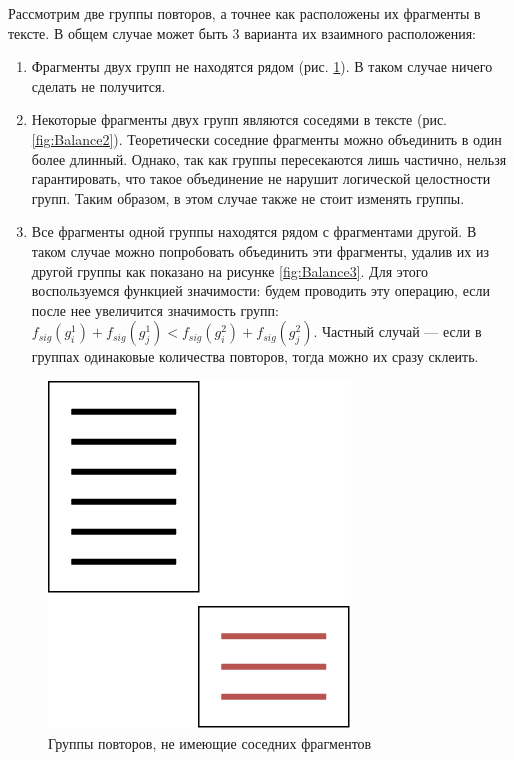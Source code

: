 \documentclass[14pt]{matmex-diploma-custom}
\begin{document}
Рассмотрим две группы повторов, а точнее как расположены их фрагменты в тексте. В общем случае может быть 3 варианта их взаимного расположения:
\begin{enumerate}
	\item Фрагменты двух групп не находятся рядом (рис. \ref{fig:Balance1}). В таком случае ничего сделать не получится.
	\item Некоторые фрагменты двух групп являются соседями в тексте (рис. \ref{fig:Balance2}). Теоретически соседние фрагменты можно объединить в один более длинный. Однако, так как группы пересекаются лишь частично, нельзя гарантировать, что такое объединение не нарушит логической целостности групп. Таким образом, в этом случае также не стоит изменять группы.
	\item Все фрагменты одной группы находятся рядом с фрагментами другой. В таком случае можно попробовать объединить эти фрагменты, удалив их из другой группы как показано на рисунке \ref{fig:Balance3}. Для этого воспользуемся функцией значимости: будем проводить эту операцию, если после нее увеличится значимость групп: $f_{sig}(g_i^1) + f_{sig}(g_j^1) < f_{sig}(g_i^2) + f_{sig}(g_j^2)$. Частный случай --- если в группах одинаковые количества повторов, тогда можно их сразу склеить.
\end{enumerate}

\begin{figure}[h!]
	\includegraphics[scale=0.5]{pictures/Balance1.png}
	\centering
	\caption{Группы повторов, не имеющие соседних фрагментов}
	\label{fig:Balance1}
\end{figure}
\end{document}
